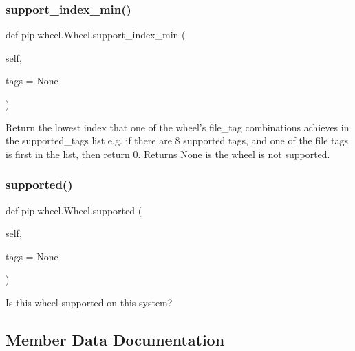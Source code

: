 \subsubsection{\texorpdfstring{support\+\_\+index\+\_\+min()}{support\_index\_min()}}
{\footnotesize\ttfamily def pip.\+wheel.\+Wheel.\+support\+\_\+index\+\_\+min (\begin{DoxyParamCaption}\item[{}]{self,  }\item[{}]{tags = {\ttfamily None} }\end{DoxyParamCaption})}

\begin{DoxyVerb}Return the lowest index that one of the wheel's file_tag combinations
achieves in the supported_tags list e.g. if there are 8 supported tags,
and one of the file tags is first in the list, then return 0.  Returns
None is the wheel is not supported.
\end{DoxyVerb}
 \mbox{\label{classpip_1_1wheel_1_1_wheel_a3560f244cd5b9ffd12d4d41903df0e47}} 
\subsubsection{\texorpdfstring{supported()}{supported()}}
{\footnotesize\ttfamily def pip.\+wheel.\+Wheel.\+supported (\begin{DoxyParamCaption}\item[{}]{self,  }\item[{}]{tags = {\ttfamily None} }\end{DoxyParamCaption})}

\begin{DoxyVerb}Is this wheel supported on this system?\end{DoxyVerb}
 

\subsection{Member Data Documentation}
\mbox{\label{classpip_1_1wheel_1_1_wheel_a34021072eb7b5988169a32494dbc4c4d}} 
